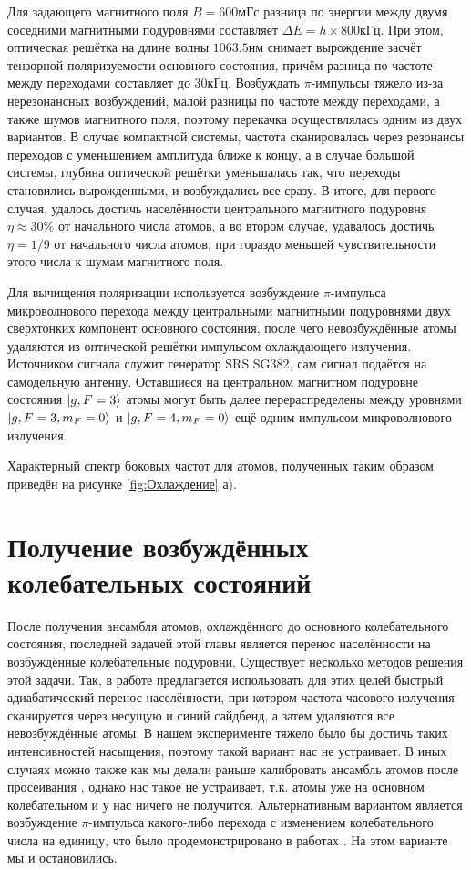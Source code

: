 Для задающего магнитного поля $B=600\unit{мГс}$ разница по энергии между двумя соседними магнитными подуровнями составляет $\Delta E = h\times 800\unit{кГц}$. 
При этом, оптическая решётка на длине волны $1063.5\unit{нм}$ снимает вырождение засчёт тензорной поляризуемости основного состояния, причём разница по частоте между переходами составляет до $30\unit{кГц}$.
Возбуждать $\pi$-импульсы тяжело из-за нерезонансных возбуждений, малой разницы по частоте между переходами, а также шумов магнитного поля, поэтому перекачка осуществлялась одним из двух вариантов.
В случае компактной системы, частота сканировалась через резонансы переходов с уменьшением амплитуда ближе к концу, а в случае большой системы, глубина оптической решётки уменьшалась так, что переходы становились вырожденными, и возбуждались все сразу. 
В итоге, для первого случая, удалось достичь населённости центрального магнитного подуровня $\eta\approx30\%$ от начального числа атомов, а во втором случае, удавалось достичь $\eta=1/9$ от начального числа атомов, при гораздо меньшей чувствительности этого числа к шумам магнитного поля.

Для вычищения поляризации используется возбуждение $\pi$-импульса микроволнового перехода между центральными магнитными подуровнями двух сверхтонких компонент основного состояния, после чего невозбуждённые атомы удаляются из оптической решётки импульсом охлаждающего излучения. 
Источником сигнала служит генератор SRS SG382, сам сигнал подаётся на самодельную антенну.
Оставшиеся на центральном магнитном подуровне состояния $\ket{g, F = 3}$ атомы могут быть далее перераспределены между уровнями $\ket{g, F = 3, m_F = 0}$ и $\ket{g, F = 4, m_F = 0}$ ещё одним импульсом микроволнового излучения.

Характерный спектр боковых частот для атомов, полученных таким образом приведён на рисунке \ref{fig:Охлаждение} а).

\section{Получение возбуждённых колебательных состояний}

После получения ансамбля атомов, охлаждённого до основного колебательного состояния, последней задачей этой главы является перенос населённости на возбуждённые колебательные подуровни. 
Существует несколько методов решения этой задачи. 
Так, в работе \cite{ushijima2018operational} предлагается использовать для этих целей быстрый адиабатический перенос населённости, при котором частота часового излучения сканируется через несущую и синий сайдбенд, а затем удаляются все невозбуждённые атомы. 
В нашем эксперименте тяжело было бы достичь таких интенсивностей насыщения, поэтому такой вариант нас не устраивает.
В иных случаях можно также как мы делали раньше калибровать ансамбль атомов после просеивания \cite{}, однако нас такое не устраивает, т.к. атомы уже на основном колебательном и у нас ничего не получится.  
Альтернативным вариантом является возбуждение $\pi$-импульса какого-либо перехода с изменением колебательного числа на единицу, что было продемонстрировано в работах \cite{}.
На этом варианте мы и остановились. 

